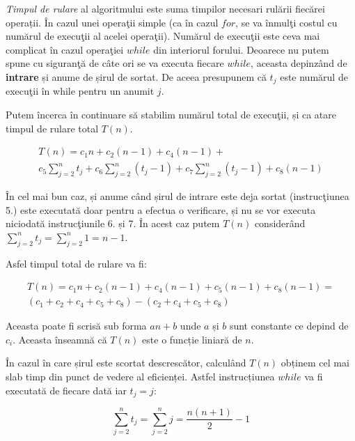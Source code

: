 \textit{Timpul de rulare} al algoritmului este suma timpilor necesari rulării fiecărei operații. În cazul unei operaţii simple (ca în cazul $for$, se va înmulţi costul cu numărul de execuţii al acelei operaţii). Numărul de execuţii este ceva mai complicat în cazul operaţiei $while$ din interiorul forului. Deoarece nu putem spune cu siguranţă de câte ori se va executa fiecare $while$, aceasta depinzând de \textbf{intrare} și anume de șirul de sortat. De aceea presupunem că $t_j$ este numărul de execuţii în while pentru un anumit $j$.

Putem încerca în continuare să stabilim numărul total de execuţii, și ca atare timpul de rulare total $T(n)$.

\begin{equation}
\begin{multlined}
T(n) = c_{1}n+c_{2}(n-1)+c_{4}(n-1) + \\ c_{5}\sum_{j=2}^{n}t_{j}+c_{6}\sum_{j=2}^{n}(t_{j}-1)+c_{7}\sum_{j=2}^{n}(t_{j}-1)+c_{8}(n-1)
\end{multlined}
\end{equation}

În cel mai bun caz, și anume când șirul de intrare este deja sortat (instrucţiunea 5.) este executată doar pentru a efectua o verificare, și nu se vor executa niciodată instrucţiunile 6. și 7. În acest caz putem $T(n)$ considerând $\sum_{j=2}^{n}t_{j} = \sum_{j=2}^{n}1 = n-1$.

Asfel timpul total de rulare va fi:

\begin{equation}
\begin{multlined}
T(n) = c_{1}n+c_{2}(n-1)+c_{4}(n-1) + c_{5}(n-1)+c_{8}(n-1) = \\( c_{1}+ c_{2}+ c_{4}+ c_{5}+ c_{8}) - ( c_{2}+ c_{4}+ c_{5}+ c_{8})
\end{multlined}
\end{equation}

Aceasta poate fi scrisă sub forma $an+b$ unde $a$ și $b$ sunt constante ce depind de $c_i$. Aceasta înseamnă că $T(n)$ este o funcție liniară de $n$.

În cazul în care șirul este scortat descrescător, calculând $T(n)$ obținem cel mai slab timp din punct de vedere al eficienței. Astfel instrucțiunea $while$ va fi executată de fiecare dată iar $t_{j}=j$:

\begin{equation}
\sum_{j=2}^{n}t_{j} = \sum_{j=2}^{n}j = \frac{n(n+1)}{2}-1
\end{equation}

